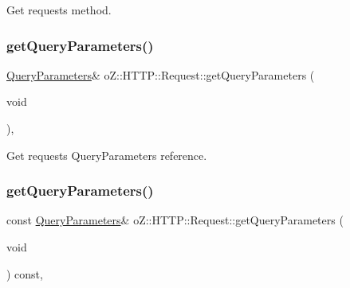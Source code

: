Get request\textquotesingle{}s method. 

\mbox{\label{classo_z_1_1_h_t_t_p_1_1_request_a6e710bce73719a47c0c8f59389a9b152}} 
\subsubsection{\texorpdfstring{getQueryParameters()}{getQueryParameters()}\hspace{0.1cm}{\footnotesize\ttfamily [1/2]}}
{\footnotesize\ttfamily \mbox{\hyperlink{namespaceo_z_1_1_h_t_t_p_adf31e2c29997ec6637f36d62ab8944d6}{Query\+Parameters}}\& o\+Z\+::\+H\+T\+T\+P\+::\+Request\+::get\+Query\+Parameters (\begin{DoxyParamCaption}\item[{void}]{ }\end{DoxyParamCaption})\hspace{0.3cm}{\ttfamily [inline]}, {\ttfamily [noexcept]}}



Get request\textquotesingle{}s Query\+Parameters reference. 

\mbox{\label{classo_z_1_1_h_t_t_p_1_1_request_a0b3375eaf3e24509f63776847ce6b784}} 
\subsubsection{\texorpdfstring{getQueryParameters()}{getQueryParameters()}\hspace{0.1cm}{\footnotesize\ttfamily [2/2]}}
{\footnotesize\ttfamily const \mbox{\hyperlink{namespaceo_z_1_1_h_t_t_p_adf31e2c29997ec6637f36d62ab8944d6}{Query\+Parameters}}\& o\+Z\+::\+H\+T\+T\+P\+::\+Request\+::get\+Query\+Parameters (\begin{DoxyParamCaption}\item[{void}]{ }\end{DoxyParamCaption}) const\hspace{0.3cm}{\ttfamily [inline]}, {\ttfamily [noexcept]}}



